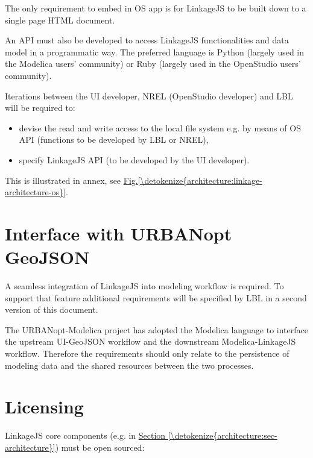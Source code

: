 \documentclass[letterpaper,10pt, openany,english]{sphinxmanual}
\begin{document}
The only requirement to embed in OS app is for LinkageJS to be built down to a single page HTML document.

An API must also be developed to access LinkageJS functionalities and data model in a programmatic way. The preferred language is Python (largely used in the Modelica users’ community) or Ruby (largely used in the OpenStudio users’ community).

Iterations between the UI developer, NREL (OpenStudio developer) and LBL will be required to:
\begin{itemize}
\item {} 
devise the read and write access to the local file system e.g. by means of OS API (functions to be developed by LBL or NREL),

\item {} 
specify LinkageJS API (to be developed by the UI developer).

\end{itemize}

This is illustrated in annex, see \hyperref[\detokenize{architecture:linkage-architecture-os}]{Fig.\@ \ref{\detokenize{architecture:linkage-architecture-os}}}.


\section{Interface with URBANopt GeoJSON}
\label{\detokenize{requirements:interface-with-urbanopt-geojson}}
A seamless integration of LinkageJS into  modeling workflow is required. To support that feature additional requirements will be specified by LBL in a second version of this document.

The URBANopt-Modelica project has adopted the Modelica language to interface the upstream UI-GeoJSON workflow and the downstream Modelica-LinkageJS workflow. Therefore the requirements should only relate to the persistence of modeling data and the shared resources between the two processes.


\section{Licensing}
\label{\detokenize{requirements:licensing}}
LinkageJS core components (e.g.  in \hyperref[\detokenize{architecture:sec-architecture}]{Section \ref{\detokenize{architecture:sec-architecture}}}) must be open sourced: 
\end{document}
